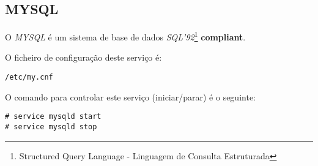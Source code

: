 \subsection{MYSQL}

O \emph{MYSQL} é um sistema de base de dados \emph{SQL'92}\footnote{Structured Query Language - Linguagem de Consulta Estruturada} \textbf{compliant}.

O ficheiro de configuração deste serviço é:

\begin{Verbatim}[commandchars=\\\{\}]
/etc/my.cnf
\end{Verbatim}

O comando para controlar este serviço (iniciar/parar) é o seguinte:

\begin{Verbatim}[commandchars=\\\{\}]
# service mysqld start
# service mysqld stop
\end{Verbatim}

